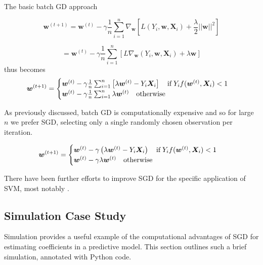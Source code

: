 \documentclass{article}
\begin{document}
The basic batch GD approach

$$
	\bm{w}^{(t+1)} = \bm{w}^{(t)} - \gamma \frac{1}{n} \sum_{i=1}^n
	\nabla_{\bm{w}} \left[ L(Y_i, \bm{w},
	\bm{X}_i) + \frac{\lambda}{2}
||\bm{w}||^2\right]
$$

$$
	= \bm{w}^{(t)} - \gamma \frac{1}{n} \sum_{i=1}^n
	 \left[ L\nabla_{\bm{w}} (Y_i, \bm{w},
	\bm{X}_i) + \lambda \bm{w} \right]
$$
thus becomes
\begin{equation}
	\bm{w}^{(t+1)} = 
	\begin{cases}
		\bm{w}^{(t)} - \gamma \frac{1}{n} \sum_{i=1}^n
		\left[
			\lambda \bm{w}^{(t)} - Y_i\bm{X}_i
		\right]
		\quad \mathrm{if} \hspace{0.2em} Y_if(\bm{w}^{(t)}, \bm{X}_i) < 1 \\

		\bm{w}^{(t)} - \gamma \frac{1}{n} \sum_{i=1}^n
		\lambda \bm{w}^{(t)} 
		\quad \textrm{otherwise} \\

	\end{cases}
\end{equation}

As previously discussed, batch GD is computationally expensive and
so for large $n$ we prefer SGD, selecting only a single randomly chosen
observation per iteration.

\begin{equation}
	\bm{w}^{(t+1)} = 
	\begin{cases}
		\bm{w}^{(t)} - \gamma 
		\left(
			\lambda \bm{w}^{(t)} - Y_i\bm{X}_i
		\right)
		\quad \mathrm{if} \hspace{0.2em} Y_if(\bm{w}^{(t)}, \bm{X}_i) < 1 \\

		\bm{w}^{(t)} - \gamma 
		\lambda \bm{w}^{(t)} 
		\quad \textrm{otherwise} \\

	\end{cases}
\end{equation}

There have been further efforts to improve SGD for the specific application of
SVM, most notably \cite{shalev2011pegasos}.

\subsection{Simulation Case Study}

Simulation provides a useful example of the computational advantages of SGD for
estimating coefficients in a predictive model. This section outlines such a
brief simulation, annotated with Python code.
\end{document}
